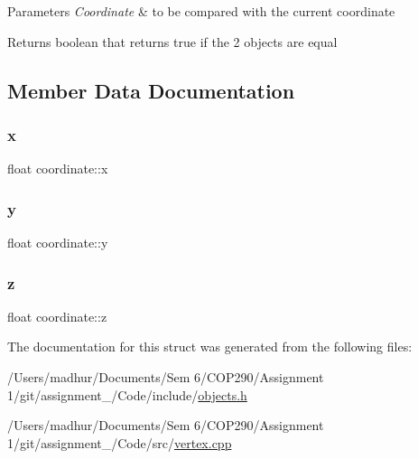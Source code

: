 \begin{DoxyParams}{Parameters}
{\em Coordinate} & to be compared with the current coordinate \\
\hline
\end{DoxyParams}
\begin{DoxyReturn}{Returns}
boolean that returns true if the 2 objects are equal 
\end{DoxyReturn}


\subsection{Member Data Documentation}
\mbox{\label{structcoordinate_acde0819ef9d30b7ce25b7d833d3df327}} 
\subsubsection{\texorpdfstring{x}{x}}
{\footnotesize\ttfamily float coordinate\+::x}

\mbox{\label{structcoordinate_ad48911206c84b1a8306a7023900ff622}} 
\subsubsection{\texorpdfstring{y}{y}}
{\footnotesize\ttfamily float coordinate\+::y}

\mbox{\label{structcoordinate_adc6bd1c982cdec4d5e7d55b1f7e62374}} 
\subsubsection{\texorpdfstring{z}{z}}
{\footnotesize\ttfamily float coordinate\+::z}



The documentation for this struct was generated from the following files\+:\begin{DoxyCompactItemize}
\item 
/\+Users/madhur/\+Documents/\+Sem 6/\+C\+O\+P290/\+Assignment 1/git/assignment\+\_/\+Code/include/\mbox{\hyperlink{objects_8h}{objects.\+h}}\item 
/\+Users/madhur/\+Documents/\+Sem 6/\+C\+O\+P290/\+Assignment 1/git/assignment\+\_/\+Code/src/\mbox{\hyperlink{vertex_8cpp}{vertex.\+cpp}}\end{DoxyCompactItemize}
